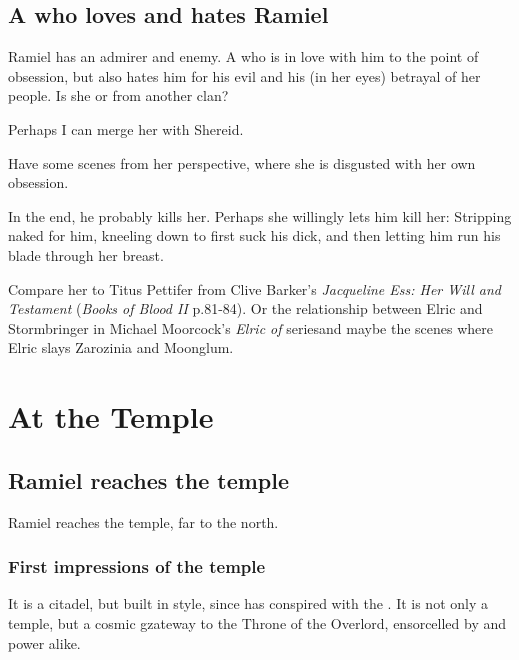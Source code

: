 \begin{garbage}
\subsection{A \resvil{} who loves and hates Ramiel}
Ramiel has an admirer and enemy. A \resvil{} who is in love with him to the point of obsession, but also hates him for his evil and his (in her eyes) betrayal of her people. Is she \Mystraacht{} or from another clan?

Perhaps I can merge her with Shereid. 

Have some scenes from her perspective, where she is disgusted with her own obsession. 

In the end, he probably kills her. Perhaps she willingly lets him kill her: Stripping naked for him, kneeling down to first suck his dick, and then letting him run his blade through her breast. 

Compare her to Titus Pettifer from Clive Barker's \emph{Jacqueline Ess: Her Will and Testament} (\emph{Books of Blood II} p.81-84). Or the relationship between Elric and Stormbringer in Michael Moorcock's \emph{Elric of \Melnibone} series\dash and maybe the scenes where Elric slays Zarozinia and Moonglum. 















\section{At the Temple}
\subsection{Ramiel reaches the temple}
Ramiel reaches the temple, far to the north. 





\subsubsection{First impressions of the temple}
It is a \Mystraacht{} citadel, but built in \ophidian{} style, since \Mystraacht{} has conspired with the \ophidians. It is not only a temple, but a cosmic gzateway to the Throne of the \Mystraacht{} Overlord, ensorcelled by \resphan{} and \ophidian{} power alike. 


\end{garbage}
